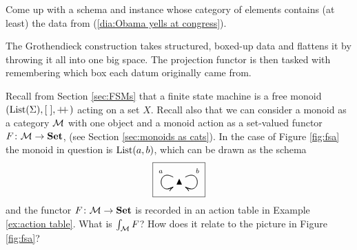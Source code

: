 \documentclass[CT4S-EN-RU]{subfiles}
\begin{document}
\begin{applicationRUS}
\end{applicationRUS}

\begin{exerciseENG}
Come up with a schema and instance whose category of elements contains (at least) the data from (\ref{dia:Obama yells at congress}).
\end{exerciseENG}

\begin{exerciseRUS}
\end{exerciseRUS}

\begin{sloganENG}
The Grothendieck construction takes structured, boxed-up data and flattens it by throwing it all into one big space. The projection functor is then tasked with remembering which box each datum originally came from.
\end{sloganENG}

\begin{sloganRUS}
\end{sloganRUS}

\begin{exerciseENG}\label{exc:FSM as elements of monoid action}
Recall from Section \ref{sec:FSMs} that a finite state machine is a free monoid $(\textnormal{List}(\Sigma),[\;],+\!\!+\hspace{1pt})$ acting on a set $X$. Recall also that we can consider a monoid as a category $\mathcal{M}$ with one object and a monoid action as a set-valued functor $F\colon\mathcal{M}\rightarrow{\mathbf{Set}}$, (see Section \ref{sec:monoids as cats}). In the case of Figure \ref{fig:fsa} the monoid in question is $\textnormal{List}(a,b)$, which can be drawn as the schema
$$\fbox{\xymatrix{\monOb\ar@(ul,dl)[]_(.3)a\ar@(ul,dl)[]_(.7){~}\ar@(ur,dr)[]^(.3)b\ar@(ur,dr)[]^(.7){~}}}$$
and the functor $F\colon\mathcal{M}\rightarrow{\mathbf{Set}}$ is recorded in an action table in Example \ref{ex:action table}. What is $\int_\mathcal{M} F$? How does it relate to the picture in Figure \ref{fig:fsa}?
\end{exerciseENG}

\begin{exerciseRUS}\label{exc:FSM as elements of monoid action}
\end{exerciseRUS}


\subsection{}
\end{document}
